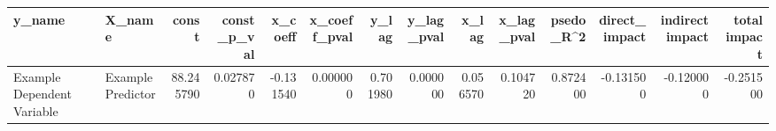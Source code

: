 \begin{tabular}{llrrrrrrrrrrrr}
\toprule
y_name & X_name & const & const_p_val & x_coeff & x_coeff_pval & y_lag & y_lag_pval & x_lag & x_lag_pval & psedo_R^2 & direct_impact & indirect impact & total impact \\
\midrule
Example Dependent Variable & Example Predictor & 88.245790 & 0.027870 & -0.131540 & 0.000000 & 0.701980 & 0.000000 & 0.056570 & 0.104720 & 0.872400 & -0.131500 & -0.120000 & -0.251500 \\
\bottomrule
\end{tabular}
